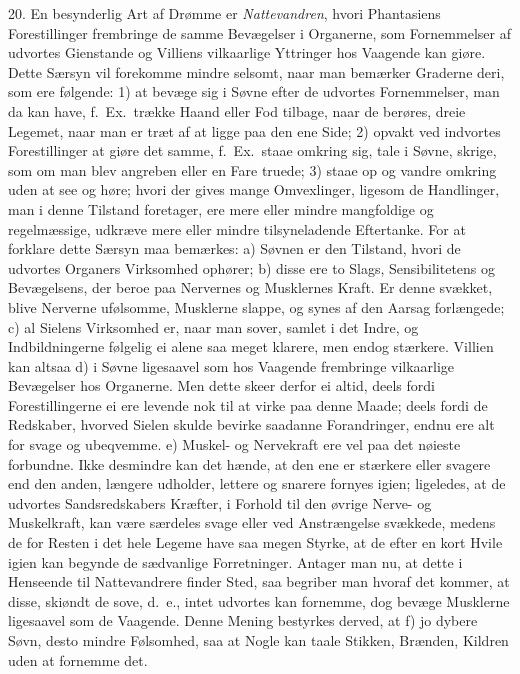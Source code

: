 \documentclass[12pt,a4paper]{article}
\newcommand{\opage}[1]{\marginnote{\footnotesize\textit{[#1]}}}
\begin{document}
20. En besynderlig Art af Drømme er \emph{Nattevandren}, hvori Phantasiens Forestillinger
frembringe de samme Bevægelser i Organerne, som Fornemmelser af udvortes Gienstande og
Villiens vilkaarlige Yttringer hos Vaagende kan giøre. Dette Særsyn vil forekomme mindre
selsomt, naar man bemærker Graderne deri, som ere følgende: 1) at bevæge sig i Søvne
efter de udvortes Fornemmelser, man da kan have, f.~Ex.\ trække Haand eller Fod tilbage,
naar de berøres, dreie Legemet, naar man er træt af at ligge paa den ene Side;
2) opvakt ved indvortes Forestillinger at giøre det samme,
\opage{131} f.~Ex.\ staae omkring sig, tale i Søvne, skrige, som om man blev angreben eller en Fare
truede; 3) staae op og vandre omkring uden at see og høre; hvori der gives mange
Omvexlinger, ligesom de Handlinger, man i denne Tilstand foretager, ere mere eller mindre
mangfoldige og regelmæssige, udkræve mere eller mindre tilsyneladende Eftertanke. For at
forklare dette Særsyn maa bemærkes: a) Søvnen er den Tilstand, hvori de udvortes Organers
Virksomhed ophører; b) disse ere to Slags, Sensibilitetens og Bevægelsens, der beroe paa
Nervernes og Musklernes Kraft. Er denne svækket, blive Nerverne ufølsomme, Musklerne
slappe, og synes af den Aarsag forlængede; c) al Sielens Virksomhed er, naar man sover,
samlet i det Indre, og Indbildningerne følgelig ei alene saa meget klarere, men endog
stærkere. Villien kan altsaa d) i Søvne ligesaavel som hos Vaagende frembringe
vilkaarlige Bevægelser hos Organerne. Men dette skeer derfor ei altid, deels fordi
Forestillingerne ei ere levende nok til at virke paa denne Maade; deels fordi de
Redskaber, hvorved Sielen skulde bevirke saadanne Forandringer, endnu ere alt for svage
og ubeqvemme. e) Muskel- og Nervekraft ere vel paa det nøieste forbundne. Ikke desmindre
kan det hænde, at den ene er stærkere eller svagere end den anden, længere udholder,
lettere og snarere fornyes igien; ligeledes, at de udvortes Sandsredskabers Kræfter, i
Forhold til den øvrige Nerve- og Muskelkraft, kan være særdeles
\opage{132} svage eller ved Anstrængelse svækkede, medens de for Resten i det hele Legeme have saa
megen Styrke, at de efter en kort Hvile igien kan begynde de sædvanlige Forretninger.
Antager man nu, at dette i Henseende til Nattevandrere finder Sted, saa begriber man
hvoraf det kommer, at disse, skiøndt de sove, d.~e., intet udvortes kan fornemme, dog
bevæge Musklerne ligesaavel som de Vaagende. Denne Mening bestyrkes derved, at f) jo
dybere Søvn, desto mindre Følsomhed, saa at Nogle kan taale Stikken, Brænden, Kildren
uden at fornemme det.
\end{document}

